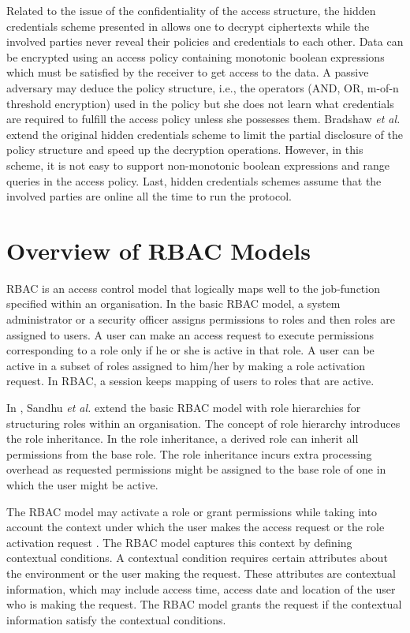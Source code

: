 \documentclass[final,5p,times,twocolumn]{elsarticle}
\begin{document}
Related to the issue of the confidentiality of the access structure, the hidden credentials scheme presented in \cite{Holt2003} allows one to decrypt ciphertexts while the involved parties never reveal their policies and credentials to each other. Data can be encrypted using an access policy containing monotonic boolean expressions which must be satisfied by the receiver to get access to the data. A passive adversary may deduce the policy structure, i.e., the operators (AND, OR, m-of-n threshold encryption) used in the policy but she does not learn what credentials are required to fulfill the access policy unless she possesses them. Bradshaw \emph{et al.} \cite{Bradshaw2004} extend the original hidden credentials scheme to limit the partial disclosure of the policy structure and speed up the decryption operations. However, in this scheme, it is not easy to support non-monotonic boolean expressions and range queries in the access policy. Last, hidden credentials schemes assume that the involved parties are online all the time to run the protocol.


\section{Overview of RBAC Models}
\label{sec:rbac-overview}
RBAC \cite{Sandhu1996} is an access control model that logically maps well to the job-function specified within an organisation. In the basic RBAC model, a system administrator or a security officer assigns permissions to roles and then roles are assigned to users. A user can make an access request to execute permissions corresponding to a role only if he or she is active in that role. A user can be active in a subset of roles assigned to him/her by making a role activation request. In RBAC, a session keeps mapping of users to roles that are active.

In \cite{Sandhu1996}, Sandhu \emph{et al.} extend the basic RBAC model with role hierarchies for structuring roles within an organisation. The concept of role hierarchy introduces the role inheritance. In the role inheritance, a derived role can inherit all permissions from the base role. The role inheritance incurs extra processing overhead as requested permissions might be assigned to the base role of one in which the user might be active. 

The RBAC model may activate a role or grant permissions while taking into account the context under which the user makes the access request or the role activation request \cite{Kim2007, Joshi2005, Strembeck2004, Neumann2003, Lupu1997}. The RBAC model captures this context by defining contextual conditions. A contextual condition requires certain attributes about the environment or the user making the request. These attributes are contextual information, which may include access time, access date and location of the user who is making the request. The RBAC model grants the request if the contextual information satisfy the contextual conditions.
\end{document}
